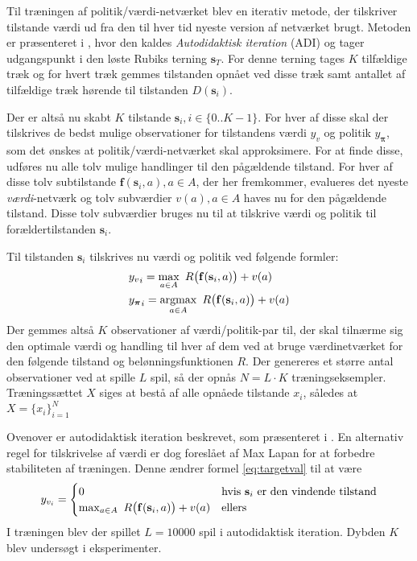 \documentclass[../main.tex]{subfiles}
\begin{document}
Til træningen af politik/værdi-netværket blev en iterativ metode, der tilskriver tilstande værdi ud fra den til hver tid nyeste version af netværket brugt. 
Metoden er præsenteret i \cite[4.1]{HumansBeGone}, hvor den kaldes \textit{Autodidaktisk iteration} (ADI) og tager udgangspunkt i den løste Rubiks terning \(\mathbf s_T\).
For denne terning tages \(K\) tilfældige træk og for hvert træk gemmes tilstanden opnået ved disse træk samt antallet af tilfældige træk hørende til tilstanden \(D(\mathbf s_i)\). 

Der er altså nu skabt \(K\) tilstande \(\mathbf{s}_{i}, i\in\{0..K-1\}\). For hver af disse skal der tilskrives de bedst mulige observationer for tilstandens værdi \(y_v\) og politik \(y_{\bm \pi }\), som det ønskes at politik/værdi-netværket skal approksimere.
For at finde disse, udføres nu alle tolv mulige handlinger til den pågældende tilstand. For hver af disse tolv subtilstande \(\mathbf f(\mathbf s_i, a), a\in A\), der her fremkommer, evalueres det nyeste \textit{værdi}-netværk og tolv subværdier \(v(a), a\in A\) haves nu for den pågældende tilstand.
Disse tolv subværdier bruges nu til at tilskrive værdi og politik til forældertilstanden \(\mathbf s _i\).	 

Til tilstanden \(\mathbf s _i\) tilskrives nu værdi og politik ved følgende formler:
\begin{align}
	&{y_{v}}_i= \operatorname*{max}_{a\in A}\  R\big(\mathbf f(\mathbf s_i, a)\big)+v(a)\label{eq:targetval}
	\\
	& {y_{\bm \pi }}_i = \operatorname*{argmax}_{a\in A} \  R\big(\mathbf f(\mathbf s_i, a)\big)+v(a) \label{eq:targetpi}
\end{align}
Der gemmes altså \(K\) observationer af værdi/politik-par til, der skal tilnærme sig den optimale værdi og handling til hver af dem ved at bruge værdinetværket for den følgende tilstand og belønningsfunktionen \(R\). 
Der genereres et større antal observationer ved at spille \(L\) spil, så der opnås \(N=L\cdot K\) træningseksempler.
Træningssættet $ X $ siges at bestå af alle opnåede tilstande $ x_i $, således at $ X=\{x_i\}_{i=1}^N $

Ovenover er autodidaktisk iteration beskrevet, som præsenteret i \cite{HumansBeGone}. En alternativ regel for tilskrivelse af værdi er dog foreslået af Max Lapan \cite{RubiksMedium} for at forbedre stabiliteten af træningen. Denne ændrer formel \eqref{eq:targetval} til at være
\begin{equation}\label{eq:lapantargeval}
y_{v_i}= 
\begin{cases}
0 & \text{hvis \(\mathbf s_i\) er den vindende tilstand}\\
\operatorname*{max}_{a\in A}\  R\big(\mathbf f(\mathbf s_i, a)\big)+v(a) &\text{ellers}
\end{cases}
\end{equation}
I træningen blev der spillet \(L=10000\) spil i autodidaktisk iteration. Dybden \(K\) blev undersøgt i eksperimenter.
\end{document}

